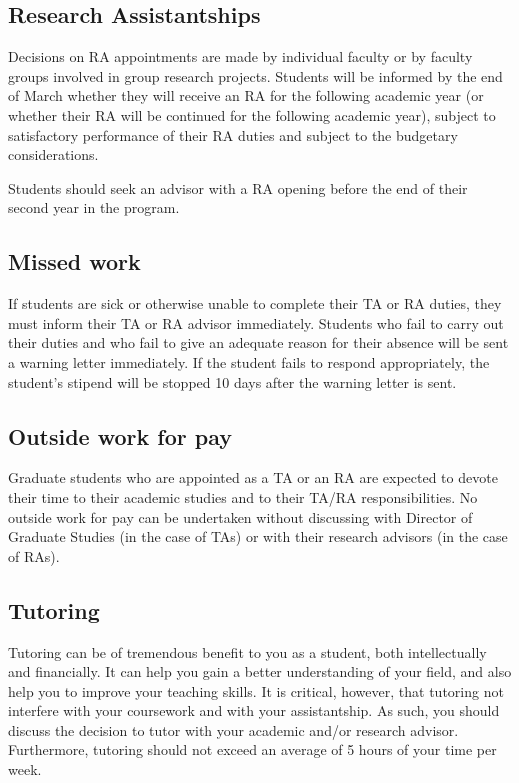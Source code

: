 \subsection{Research Assistantships}

Decisions on RA appointments are made by individual faculty or by
faculty groups involved in group research projects. Students will be
informed by the end of March whether they will receive an RA for the
following academic year (or whether their RA will be continued for
the following academic year), subject to satisfactory performance of
their RA duties and subject to the budgetary considerations.

Students should seek an advisor with a RA opening before the end of
their second year in the program.

\subsection{Missed work}

 If students are sick or otherwise unable to
complete their TA or RA duties, they must inform their TA or RA
advisor immediately. Students who fail to carry out their duties and
who fail to give an adequate reason for their absence will be sent a
warning letter immediately. If the student fails to respond
appropriately, the student’s stipend will be stopped 10 days after the
warning letter is sent.

\subsection{Outside work for pay}

Graduate students who are appointed as a TA
or an RA are expected to devote their time to their academic studies
and to their TA/RA responsibilities. No outside work for pay can be
undertaken without discussing with Director of Graduate Studies (in
the case of TAs) or with their research advisors (in the case of RAs).

\subsection{Tutoring}

Tutoring can be of tremendous benefit to you as a student, both
intellectually and financially.  It can help you gain a better
understanding of your field, and also help you to improve your
teaching skills.  It is critical, however, that tutoring not interfere
with your coursework and with your assistantship.  As such, you should
discuss the decision to tutor with your academic and/or research
advisor.  Furthermore, tutoring should not exceed an average of 5
hours of your time per week.

